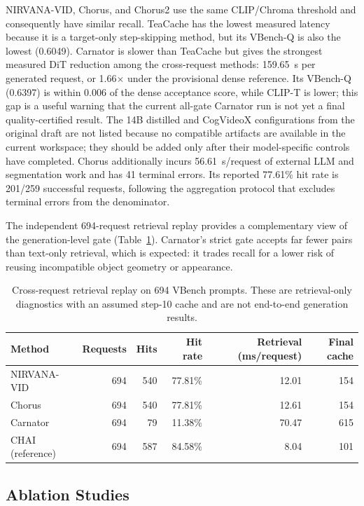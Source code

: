 NIRVANA-VID, Chorus, and Chorus2 use the same CLIP/Chroma threshold and consequently
have similar recall.  TeaCache has the lowest measured latency because it is a
target-only step-skipping method, but its VBench-Q is also the lowest (0.6049).
Carnator is slower than TeaCache but gives the strongest measured DiT reduction
among the cross-request methods: 159.65~s per generated request, or 1.66$\times$
under the provisional dense reference.  Its VBench-Q (0.6397) is within 0.006 of
the dense acceptance score, while CLIP-T is lower; this gap is a useful warning
that the current all-gate Carnator run is not yet a final quality-certified result.
The 14B distilled and CogVideoX configurations from the original draft are not
listed because no compatible artifacts are available in the current workspace;
they should be added only after their model-specific controls have completed.
Chorus additionally incurs 56.61~s/request of external LLM and segmentation work
and has 41 terminal errors.  Its reported 77.61\% hit rate is 201/259 successful
requests, following the aggregation protocol that excludes terminal errors from
the denominator.

The independent 694-request retrieval replay provides a complementary view of the
generation-level gate (Table~\ref{tab:retrieval_replay}).  Carnator's strict gate
accepts far fewer pairs than text-only retrieval, which is expected: it trades
recall for a lower risk of reusing incompatible object geometry or appearance.

\begin{table}[htbp]
\centering
\caption{Cross-request retrieval replay on 694 VBench prompts.  These are retrieval-only
diagnostics with an assumed step-10 cache and are not end-to-end generation results.}
\label{tab:retrieval_replay}
\begin{tabular}{l r r r r r}
\toprule
Method & Requests & Hits & Hit rate & Retrieval (ms/request) & Final cache \\
\midrule
NIRVANA-VID & 694 & 540 & 77.81\% & 12.01 & 154 \\
Chorus & 694 & 540 & 77.81\% & 12.61 & 154 \\
Carnator & 694 & 79 & 11.38\% & 70.47 & 615 \\
CHAI (reference) & 694 & 587 & 84.58\% & 8.04 & 101 \\
\bottomrule
\end{tabular}
\end{table}

\subsection{Ablation Studies}

